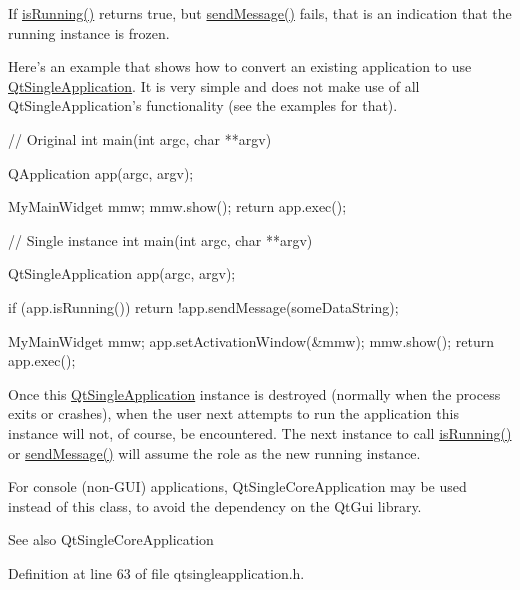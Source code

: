 If \hyperlink{class_qt_single_application_aa9f0e6e4f18ac79bbb7a955cd860894d}{isRunning()} returns true, but \hyperlink{class_qt_single_application_a0e2f3900f0290913c738ec6b4b959922}{sendMessage()} fails, that is an indication that the running instance is frozen.

Here's an example that shows how to convert an existing application to use \hyperlink{class_qt_single_application}{QtSingleApplication}. It is very simple and does not make use of all QtSingleApplication's functionality (see the examples for that).


\begin{DoxyCode}
    // Original
    int main(int argc, char **argv)
    {
        QApplication app(argc, argv);

        MyMainWidget mmw;
        mmw.show();
        return app.exec();
    }

    // Single instance
    int main(int argc, char **argv)
    {
        QtSingleApplication app(argc, argv);

        if (app.isRunning())
            return !app.sendMessage(someDataString);

        MyMainWidget mmw;
        app.setActivationWindow(&mmw);
        mmw.show();
        return app.exec();
    }
\end{DoxyCode}


Once this \hyperlink{class_qt_single_application}{QtSingleApplication} instance is destroyed (normally when the process exits or crashes), when the user next attempts to run the application this instance will not, of course, be encountered. The next instance to call \hyperlink{class_qt_single_application_aa9f0e6e4f18ac79bbb7a955cd860894d}{isRunning()} or \hyperlink{class_qt_single_application_a0e2f3900f0290913c738ec6b4b959922}{sendMessage()} will assume the role as the new running instance.

For console (non-\/GUI) applications, QtSingleCoreApplication may be used instead of this class, to avoid the dependency on the QtGui library.

\begin{DoxySeeAlso}{See also}
QtSingleCoreApplication 
\end{DoxySeeAlso}


Definition at line 63 of file qtsingleapplication.h.



